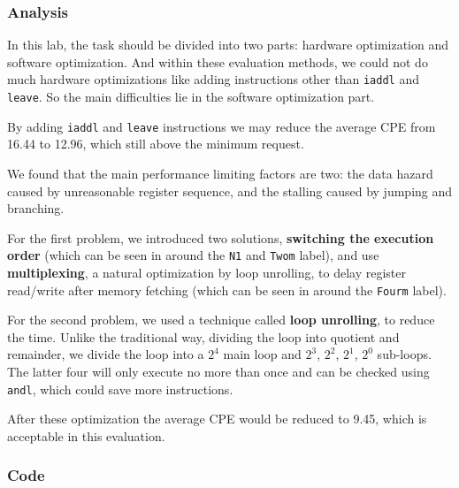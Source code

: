 \documentclass{article}
\begin{document}
\subsubsection{Analysis}

In this lab, the task should be divided into two parts: hardware optimization and software optimization. And within these evaluation methods, we could not do much hardware optimizations like adding instructions other than \texttt{iaddl} and \texttt{leave}. So the main difficulties lie in the software optimization part.

By adding \texttt{iaddl} and \texttt{leave} instructions we may reduce the average CPE from 16.44 to 12.96, which still above the minimum request.

We found that the main performance limiting factors are two: the data hazard caused by unreasonable register sequence, and the stalling caused by jumping and branching.

For the first problem, we introduced two solutions, \textbf{switching the execution order} (which can be seen in around the \texttt{N1} and \texttt{Twom} label), and use \textbf{multiplexing}, a natural optimization by loop unrolling, to delay register read/write after memory fetching (which can be seen in around the \texttt{Fourm} label).

For the second problem, we used a technique called \textbf{loop unrolling}, to reduce the time. Unlike the traditional way, dividing the loop into quotient and remainder, we divide the loop into a $2^4$ main loop and $2^3$, $2^2$, $2^1$, $2^0$ sub-loops. The latter four will only execute no more than once and can be checked using \texttt{andl}, which could save more instructions.

After these optimization the average CPE would be reduced to 9.45, which is acceptable in this evaluation.


\subsubsection{Code}
\end{document}
